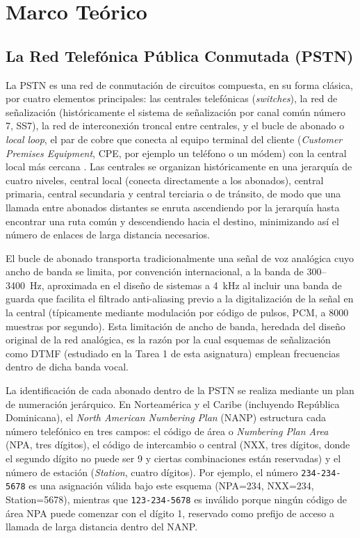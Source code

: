 \documentclass[conference]{IEEEtran}
\begin{document}
\section{Marco Teórico}

\subsection{La Red Telefónica Pública Conmutada (PSTN)}

La PSTN es una red de conmutación de circuitos compuesta, en su forma clásica, por cuatro elementos principales: las centrales telefónicas (\textit{switches}), la red de señalización (históricamente el sistema de señalización por canal común número 7, SS7), la red de interconexión troncal entre centrales, y el bucle de abonado o \textit{local loop}, el par de cobre que conecta al equipo terminal del cliente (\textit{Customer Premises Equipment}, CPE, por ejemplo un teléfono o un módem) con la central local más cercana \cite{itu-q23}. Las centrales se organizan históricamente en una jerarquía de cuatro niveles, central local (conecta directamente a los abonados), central primaria, central secundaria y central terciaria o de tránsito, de modo que una llamada entre abonados distantes se enruta ascendiendo por la jerarquía hasta encontrar una ruta común y descendiendo hacia el destino, minimizando así el número de enlaces de larga distancia necesarios.

El bucle de abonado transporta tradicionalmente una señal de voz analógica cuyo ancho de banda se limita, por convención internacional, a la banda de 300--3400~Hz, aproximada en el diseño de sistemas a 4~kHz al incluir una banda de guarda que facilita el filtrado anti-aliasing previo a la digitalización de la señal en la central (típicamente mediante modulación por código de pulsos, PCM, a 8000 muestras por segundo). Esta limitación de ancho de banda, heredada del diseño original de la red analógica, es la razón por la cual esquemas de señalización como DTMF (estudiado en la Tarea 1 de esta asignatura) emplean frecuencias dentro de dicha banda vocal.

La identificación de cada abonado dentro de la PSTN se realiza mediante un plan de numeración jerárquico. En Norteamérica y el Caribe (incluyendo República Dominicana), el \textit{North American Numbering Plan} (NANP) estructura cada número telefónico en tres campos: el código de área o \textit{Numbering Plan Area} (NPA, tres dígitos), el código de intercambio o central (NXX, tres dígitos, donde el segundo dígito no puede ser 9 y ciertas combinaciones están reservadas) y el número de estación (\textit{Station}, cuatro dígitos). Por ejemplo, el número \texttt{234-234-5678} es una asignación válida bajo este esquema (NPA=234, NXX=234, Station=5678), mientras que \texttt{123-234-5678} es inválido porque ningún código de área NPA puede comenzar con el dígito 1, reservado como prefijo de acceso a llamada de larga distancia dentro del NANP.
\end{document}
